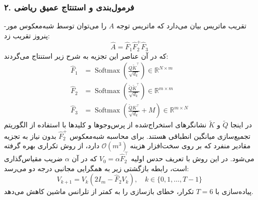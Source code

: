 \subsubsection*{۲. فرمول‌بندی و استنتاج عمیق ریاضی }
تقریب ماتریس  بیان می‌دارد که ماتریس توجه $A$ را می‌توان توسط شبه‌معکوس مور-پنروز  تقریب زد:
\begin{equation}
\hat{A} = \hat{F}_1 \hat{F}_2^+ \hat{F}_3
\end{equation}
که در آن عناصر این تجزیه به شرح زیر استنتاج می‌گردند:
\begin{align}
\hat{F}_1 &= \operatorname{Softmax}\left(\frac{Q \tilde{K}^\top}{\sqrt{d_k}}\right) \in \mathbb{R}^{N \times m} \\
\hat{F}_2 &= \operatorname{Softmax}\left(\frac{\tilde{Q} \tilde{K}^\top}{\sqrt{d_k}}\right) \in \mathbb{R}^{m \times m} \\
\hat{F}_3 &= \operatorname{Softmax}\left(\frac{\tilde{Q} K^\top}{\sqrt{d_k}} + M\right) \in \mathbb{R}^{m \times N}
\end{align}
در اینجا $\tilde{Q}$ و $\tilde{K}$ نشانگرهای استخراج‌شده از پرس‌وجوها و کلیدها با استفاده از الگوریتم تجمیع‌سازی میانگین انطباقی  هستند.
برای محاسبه شبه‌معکوس $\hat{F}_2^+$ بدون نیاز به تجزیه مقادیر منفرد  که بر روی سخت‌افزار هزینه $\mathcal{O}(m^3)$ دارد، از روش تکراری  بهره گرفته می‌شود. در این روش با تعریف حدس اولیه $V_0 = \alpha \hat{F}_2^\top$ که در آن $\alpha$ ضریب مقیاس‌گذاری است، رابطه بازگشتی زیر به همگرایی مجانبی درجه دو  می‌رسد:
\begin{equation}
V_{k+1} = V_k (2 I_m - \hat{F}_2 V_k), \quad k \in \{0, 1, \dots, T-1\}
\end{equation}
پیاده‌سازی با $T=6$ تکرار، خطای بازسازی را به کمتر از تلرانس ماشین  کاهش می‌دهد.

